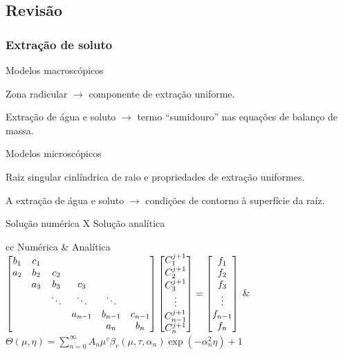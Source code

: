 \subsection{Revisão}
\begin{frame}\frametitle{Extração de soluto}
  \scriptsize 
  \begin{block}{Modelos macroscópicos}
    {\scriptsize 
      Zona radicular $\rightarrow$ componente de extração uniforme.

      Extração de água e soluto $\rightarrow$ termo ``sumidouro'' nas equações de balanço de massa.
    }
  \end{block}
  \begin{block}{Modelos microscópicos}
    {\scriptsize 
      Raiz singular cinlíndrica de raio e propriedades de extração uniformes.

      A extração de água e soluto $\rightarrow$ condições de contorno à superfície da raíz.
    }
  \end{block} \pause
  \begin{block}{Solução numérica X Solução analítica}
  \end{block}
  \bgroup
  \def\arraystretch{1.5}
  \begin{tabular}{cc}
    \scriptsize Numérica & \scriptsize Analítica \\
    \tiny
\(
 \begin{bmatrix}
 b_1 & c_1 & & & &  \\
 a_2 & b_2 & c_2 & & &  \\
  & a_3 & b_3 & c_3 & &  \\
  &  & \ddots & \ddots & \ddots &  \\
  &  & & a_{n-1} & b_{n-1} & c_{n-1}  \\
  &  & & & a_{n} & b_{n}  \cr \end{bmatrix}
 \begin{bmatrix}
 C^{j+1}_1 \\
 C^{j+1}_2 \\
 C^{j+1}_3 \\
 \vdots \\
 C^{j+1}_{n-1} \\
 C^{j+1}_n \\ \end{bmatrix}
=
 \begin{bmatrix}
 f_1 \\
 f_2 \\
 f_3 \\
 \vdots \\
 f_{n-1} \\
 f_n \\ \end{bmatrix}
\)
 & 
\tiny\(
\Theta(\mu,\eta) = \sum_{n=0}^\infty A_n \mu^v \beta_v(\mu,\tau,\alpha_n) \exp(-\alpha_n^2\eta)+1
\)    \\
  \end{tabular}
  \egroup
\end{frame}

